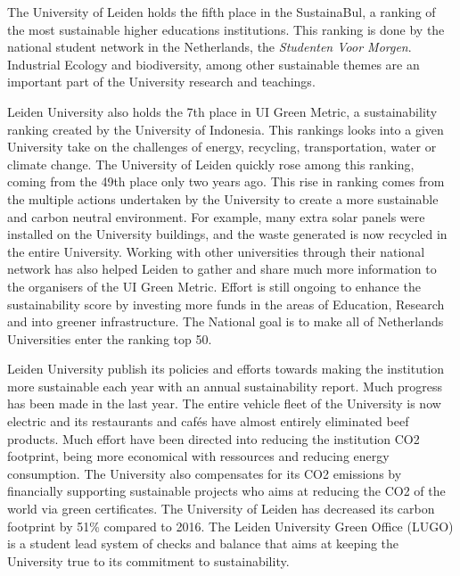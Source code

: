 The University of Leiden holds the fifth place in the SustainaBul, a ranking of the most sustainable higher educations institutions. This ranking is done by the national student network in the Netherlands, the \textit{Studenten Voor Morgen}. Industrial Ecology and biodiversity, among other sustainable themes are an important part of the University research and teachings. 

Leiden University also holds the 7th place in UI Green Metric, a sustainability ranking created by the University of Indonesia. This rankings looks into a given University take on the challenges of energy, recycling, transportation, water or climate change. The University of Leiden quickly rose among this ranking, coming from the 49th place only two years ago. This rise in ranking comes from the multiple actions undertaken by the University to create a more sustainable and carbon neutral environment. For example, many extra solar panels were installed on the University buildings, and the waste generated is now recycled in the entire University. Working with other universities through their national network has also helped Leiden to gather and share much more information to the organisers of the UI Green Metric. Effort is still ongoing to enhance the sustainability score by investing more funds in the areas of Education, Research and into greener infrastructure. The National goal is to make all of Netherlands Universities enter the ranking top 50. 

Leiden University publish its policies and efforts towards making the institution more sustainable each year with an annual sustainability report. Much progress has been made in the last year. The entire vehicle fleet of the University is now electric and its restaurants and cafés have almost entirely eliminated beef products. Much effort have been directed into reducing the institution CO2 footprint, being more economical with ressources and reducing energy consumption. The University also compensates for its CO2 emissions by financially supporting sustainable projects who aims at reducing the CO2 of the world via green certificates. The University of Leiden has decreased its carbon footprint by 51\% compared to 2016. The Leiden University Green Office (LUGO) is a student lead system of checks and balance that aims at keeping the University true to its commitment to sustainability.  


